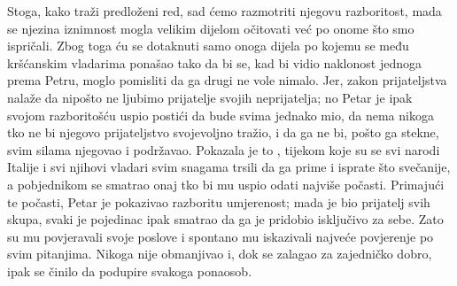 \documentclass[a5paper,twoside]{article}
\begin{document}
Stoga, kako traži predloženi red, sad ćemo razmotriti njegovu razboritost, mada se njezina iznimnost mogla velikim dijelom očitovati već po onome što smo ispričali.  Zbog toga ću se dotaknuti samo onoga dijela po kojemu se među kršćanskim vladarima ponašao tako da bi se, kad bi vidio naklonost jednoga prema Petru, moglo pomisliti da ga drugi ne vole nimalo.  Jer, zakon prijateljstva nalaže da nipošto ne ljubimo prijatelje svojih neprijatelja; no Petar je ipak svojom razboritošću uspio postići da bude svima jednako mio, da nema nikoga tko ne bi njegovo prijateljstvo svojevoljno tražio, i da ga ne bi, pošto ga stekne, svim silama njegovao i podržavao.  Pokazala je to , tijekom koje su se svi narodi Italije i svi njihovi vladari svim snagama trsili da ga prime i isprate što svečanije, a pobjednikom se smatrao onaj tko bi mu uspio odati najviše počasti.  Primajući te počasti, Petar je pokazivao razboritu umjerenost; mada je bio prijatelj svih skupa, svaki je pojedinac ipak smatrao da ga je pridobio isključivo za sebe.  Zato su mu povjeravali svoje poslove i spontano mu iskazivali najveće povjerenje po svim pitanjima.  Nikoga nije obmanjivao i, dok se zalagao za zajedničko dobro, ipak se činilo da podupire svakoga ponaosob. 
\end{document}

